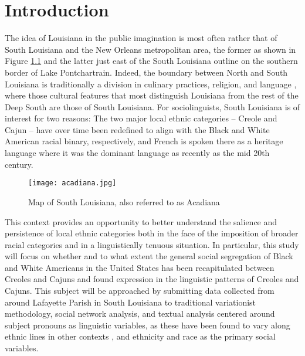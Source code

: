\chapter{Introduction}
The idea of Louisiana in the public imagination is most often rather that of South Louisiana and the New Orleans metropolitan area, the former as shown in Figure \ref{fig:south_la} and the latter just east of the South Louisiana outline on the southern border of Lake Pontchartrain.
Indeed, the boundary between North and South Louisiana is traditionally a division in culinary practices, religion, and language \parencite[p.~309]{trepanier_french_1988}, where those cultural features that most distinguish Louisiana from the rest of the Deep South are those of South Louisiana.
For sociolinguists, South Louisiana is of interest for two reasons: The two major local ethnic categories -- Creole and Cajun -- have over time been redefined to align with the Black and White American racial binary, respectively, and French is spoken there as a heritage language where it was the dominant language as recently as the mid 20th century.

\begin{figure}[tbhp]
  \centering
  \caption{Map of South Louisiana, also referred to as Acadiana}
  \label{fig:south_la}
  \texttt{[image: acadiana.jpg]}
\end{figure}

This context provides an opportunity to better understand the salience and persistence of local ethnic categories both in the face of the imposition of broader racial categories and in a linguistically tenuous situation.
In particular, this study will focus on whether and to what extent the general social segregation of Black and White Americans in the United States \parencite{smith_social_2014} has been recapitulated between Creoles and Cajuns and found expression in the linguistic patterns of Creoles and Cajuns.
This subject will be approached by submitting data collected from around Lafayette Parish in South Louisiana to traditional variationist methodology, social network analysis, and textual analysis centered around subject pronouns as linguistic variables, as these have been found to vary along ethnic lines in other contexts \parencite{dajko_ethnic_2009, rottet_language_1995}, and ethnicity and race as the primary social variables.

